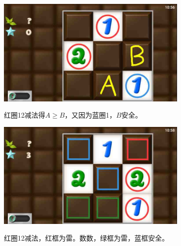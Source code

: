 \subsection{} %
\begin{center}
    \includegraphics[width=0.7\textwidth]{puzzlelow/13-1.jpg}
\end{center}
红圈12减法得$A\ge B$，又因为蓝圈1，$B$安全。
\begin{center}
    \includegraphics[width=0.7\textwidth]{puzzlelow/13-2.jpg}
\end{center}
红圈12减法，红框为雷。数数，绿框为雷，蓝框安全。

